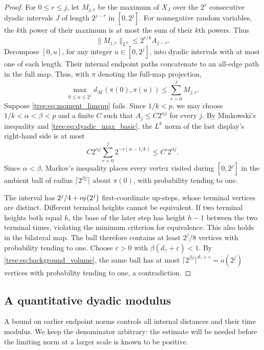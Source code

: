 \begin{proof}
For $0\leq r\leq j$, let $M_{j,r}$ be the maximum of $X_J$ over the
$2^r$ consecutive dyadic intervals $J$ of length $2^{j-r}$ in
$[0,2^j]$. For nonnegative random variables, the $k$th power of their
maximum is at most the sum of their $k$th powers. Thus
\begin{equation}\label{tree:eq:dyadic_max_basic}
 \|M_{j,r}\|_{L^k}\leq2^{r/k}A_{j-r}.
\end{equation}
Decompose $[0,u]$, for any integer $u\in[0,2^j]$, into dyadic intervals
with at most one of each length. Their internal endpoint paths concatenate
to an all-edge path in the full map. Thus, with $\pi$ denoting the
full-map projection,
\[
 \max_{0\leq u\leq2^j}d_{\mathcal M}(\pi(0),\pi(u))
 \leq\sum_{r=0}^jM_{j,r}.
\]
Suppose \eqref{tree:eq:moment_limsup} fails. Since $1/k<p$, we may choose
$1/k<\alpha<\beta<p$ and a finite $C$ such that
$A_j\leq C2^{\alpha j}$ for every $j$. By Minkowski's inequality and
\eqref{tree:eq:dyadic_max_basic}, the $L^k$ norm of the last display's
right-hand side is at most
\[
 C2^{\alpha j}\sum_{r=0}^j2^{-r(\alpha-1/k)}
 \leq C'2^{\alpha j}.
\]
Since $\alpha<\beta$, Markov's inequality places every vertex visited
during $[0,2^j]$ in the ambient ball of radius $\lceil2^{\beta j}\rceil$
about $\pi(0)$, with probability tending to one.

The interval has $2^j/4+o_{\mathbb P}(2^j)$ first-coordinate up-steps, whose
terminal vertices are distinct. Different terminal heights cannot be
equivalent. If two terminal heights both equal $h$, the base of the later
step has height $h-1$ between the two terminal times, violating the minimum
criterion for equivalence. This also holds in the bilateral map. The ball
therefore contains at least $2^j/8$ vertices with probability tending to
one. Choose $\varepsilon>0$ with $\beta(d_\gamma+\varepsilon)<1$.
By \eqref{tree:eq:background_volume}, the same ball has at most
$\lceil2^{\beta j}\rceil^{d_\gamma+\varepsilon}=o(2^j)$ vertices with
probability tending to one, a contradiction.
\end{proof}

\subsection{A quantitative dyadic modulus}

A bound on earlier endpoint norms controls all internal distances and
their time modulus. We keep the denominator arbitrary: the estimate
will be needed before the limiting norm at a larger scale is known to
be positive.

